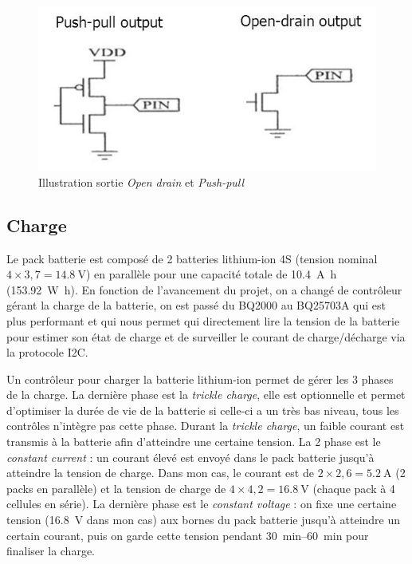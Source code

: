 \documentclass[a4paper, 12pt]{report}
\begin{document}
\begin{figure}[H]
\centering
\includegraphics[scale=0.55]{figures/screenshots/opendrain_pushpull.png}
\caption{Illustration sortie \emph{Open drain} et \emph{Push-pull}} 
\label{fig:opendrain_pushpull}
\end{figure}

\subsection{Charge}
Le pack batterie est composé de 2 batteries lithium-ion 4S (tension nominal $4\times3,7=\SI{14.8}{\volt}$) en parallèle pour une capacité totale de \SI{10.4}{\ampere\hour} (\SI{153.92}{\watt\hour}). En fonction de l’avancement du projet, on a changé de contrôleur gérant la charge de la batterie, on est passé du BQ2000 au BQ25703A qui est plus performant et qui nous permet qui directement lire la tension de la batterie pour estimer son état de charge et de surveiller le courant de charge/décharge via la protocole I2C.

Un contrôleur pour charger la batterie lithium-ion permet de gérer les 3 phases de la charge. La dernière phase est la \emph{trickle charge}, elle est optionnelle et permet d’optimiser la durée de vie de la batterie si celle-ci a un très bas niveau, tous les contrôles n’intègre pas cette phase. Durant la \emph{trickle charge}, un faible courant est transmis à la batterie afin d’atteindre une certaine tension. La 2\ieme{} phase est le \emph{constant current} : un courant élevé est envoyé dans le pack batterie jusqu’à atteindre la tension de charge. Dans mon cas, le courant est de $2\times2,6 = \SI{5.2}{\ampere}$ (2 packs en parallèle) et la tension de charge de $4\times4,2 = \SI{16.8}{\volt}$ (chaque pack à 4 cellules en série). La dernière phase est le \emph{constant voltage} : on fixe une certaine tension (\SI{16.8}{\volt} dans mon cas) aux bornes du pack batterie jusqu’à atteindre un certain courant, puis on garde cette tension pendant \SIrange{30}{60}{\minute} pour finaliser la charge.
\end{document}
